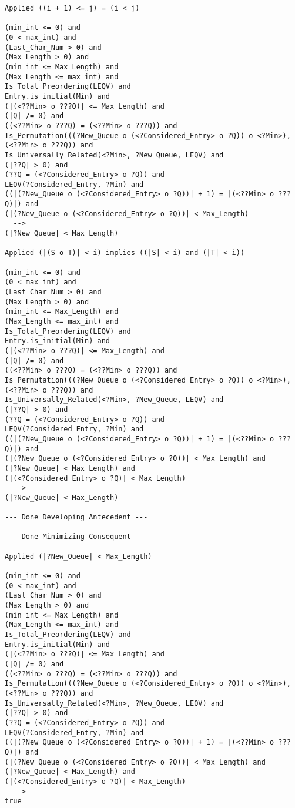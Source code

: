 \begin{lstlisting}[language=resolve]
Applied ((i + 1) <= j) = (i < j)

(min_int <= 0) and
(0 < max_int) and
(Last_Char_Num > 0) and
(Max_Length > 0) and
(min_int <= Max_Length) and
(Max_Length <= max_int) and
Is_Total_Preordering(LEQV) and
Entry.is_initial(Min) and
(|(<??Min> o ???Q)| <= Max_Length) and
(|Q| /= 0) and
((<??Min> o ???Q) = (<??Min> o ???Q)) and
Is_Permutation(((?New_Queue o (<?Considered_Entry> o ?Q)) o <?Min>), (<??Min> o ???Q)) and
Is_Universally_Related(<?Min>, ?New_Queue, LEQV) and
(|??Q| > 0) and
(??Q = (<?Considered_Entry> o ?Q)) and
LEQV(?Considered_Entry, ?Min) and
((|(?New_Queue o (<?Considered_Entry> o ?Q))| + 1) = |(<??Min> o ???Q)|) and
(|(?New_Queue o (<?Considered_Entry> o ?Q))| < Max_Length)
  -->
(|?New_Queue| < Max_Length)

Applied (|(S o T)| < i) implies ((|S| < i) and (|T| < i))

(min_int <= 0) and
(0 < max_int) and
(Last_Char_Num > 0) and
(Max_Length > 0) and
(min_int <= Max_Length) and
(Max_Length <= max_int) and
Is_Total_Preordering(LEQV) and
Entry.is_initial(Min) and
(|(<??Min> o ???Q)| <= Max_Length) and
(|Q| /= 0) and
((<??Min> o ???Q) = (<??Min> o ???Q)) and
Is_Permutation(((?New_Queue o (<?Considered_Entry> o ?Q)) o <?Min>), (<??Min> o ???Q)) and
Is_Universally_Related(<?Min>, ?New_Queue, LEQV) and
(|??Q| > 0) and
(??Q = (<?Considered_Entry> o ?Q)) and
LEQV(?Considered_Entry, ?Min) and
((|(?New_Queue o (<?Considered_Entry> o ?Q))| + 1) = |(<??Min> o ???Q)|) and
(|(?New_Queue o (<?Considered_Entry> o ?Q))| < Max_Length) and
(|?New_Queue| < Max_Length) and
(|(<?Considered_Entry> o ?Q)| < Max_Length)
  -->
(|?New_Queue| < Max_Length)

--- Done Developing Antecedent ---

--- Done Minimizing Consequent ---

Applied (|?New_Queue| < Max_Length)

(min_int <= 0) and
(0 < max_int) and
(Last_Char_Num > 0) and
(Max_Length > 0) and
(min_int <= Max_Length) and
(Max_Length <= max_int) and
Is_Total_Preordering(LEQV) and
Entry.is_initial(Min) and
(|(<??Min> o ???Q)| <= Max_Length) and
(|Q| /= 0) and
((<??Min> o ???Q) = (<??Min> o ???Q)) and
Is_Permutation(((?New_Queue o (<?Considered_Entry> o ?Q)) o <?Min>), (<??Min> o ???Q)) and
Is_Universally_Related(<?Min>, ?New_Queue, LEQV) and
(|??Q| > 0) and
(??Q = (<?Considered_Entry> o ?Q)) and
LEQV(?Considered_Entry, ?Min) and
((|(?New_Queue o (<?Considered_Entry> o ?Q))| + 1) = |(<??Min> o ???Q)|) and
(|(?New_Queue o (<?Considered_Entry> o ?Q))| < Max_Length) and
(|?New_Queue| < Max_Length) and
(|(<?Considered_Entry> o ?Q)| < Max_Length)
  -->
true


\end{lstlisting}
